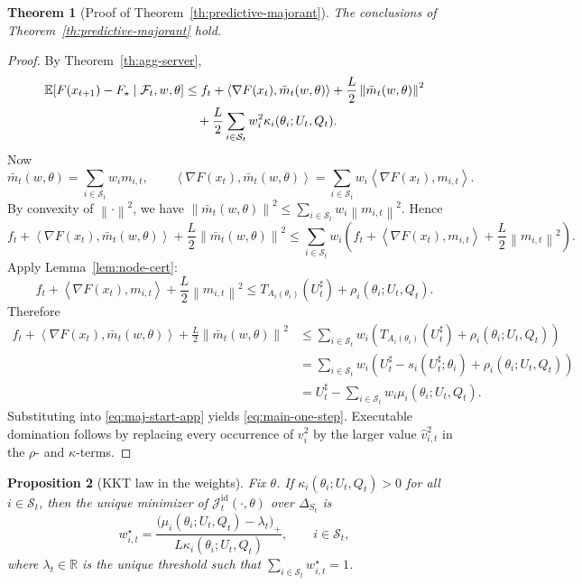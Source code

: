 \documentclass{article}
\newtheorem{theorem}{Theorem}[section]
\newtheorem{proposition}[theorem]{Proposition}
\theoremstyle{definition}
\newcommand{\RR}{\mathbb R}
\newcommand{\EE}{\mathbb E}
\newcommand{\cF}{\mathcal F}
\newcommand{\norm}[1]{\left\lVert #1\right\rVert}
\newcommand{\ip}[2]{\left\langle #1,#2\right\rangle}
\begin{document}
\begin{theorem}[Proof of Theorem~\ref{th:predictive-majorant}]
\label{th:predictive-majorant-proof}
The conclusions of Theorem~\ref{th:predictive-majorant} hold.
\end{theorem}

\begin{proof}
By Theorem~\ref{th:agg-server},
\begin{align}
\EE[F(x_{t+1})-F_\star\mid \cF_t,w,\theta]
&\le
f_t
+
\ip{\nabla F(x_t)}{\bar m_t(w,\theta)}
+
\frac{L}{2}\norm{\bar m_t(w,\theta)}^2
\notag\\
&\quad+
\frac{L}{2}\sum_{i\in\mathcal S_t}w_i^2\kappa_i(\theta_i;U_t,Q_t).
\label{eq:maj-start-app}
\end{align}
Now
\[
\bar m_t(w,\theta)=\sum_{i\in\mathcal S_t} w_i m_{i,t},
\qquad
\ip{\nabla F(x_t)}{\bar m_t(w,\theta)}
=
\sum_{i\in\mathcal S_t} w_i \ip{\nabla F(x_t)}{m_{i,t}}.
\]
By convexity of $\norm{\cdot}^2$, we have $
\norm{\bar m_t(w,\theta)}^2
\le
\sum_{i\in\mathcal S_t}w_i\norm{m_{i,t}}^2$.
Hence
\[
f_t
+
\ip{\nabla F(x_t)}{\bar m_t(w,\theta)}
+
\frac{L}{2}\norm{\bar m_t(w,\theta)}^2
\le
\sum_{i\in\mathcal S_t}w_i
\left(
f_t+\ip{\nabla F(x_t)}{m_{i,t}}+\frac{L}{2}\norm{m_{i,t}}^2
\right).
\]
Apply Lemma~\ref{lem:node-cert}:
\[
f_t+\ip{\nabla F(x_t)}{m_{i,t}}+\frac{L}{2}\norm{m_{i,t}}^2
\le
T_{A_i(\theta_i)}(U_t^\sharp)+\rho_i(\theta_i;U_t,Q_t).
\]
Therefore
\begin{align*}
f_t
+
\ip{\nabla F(x_t)}{\bar m_t(w,\theta)}
+
\frac{L}{2}\norm{\bar m_t(w,\theta)}^2
&\le
\sum_{i\in\mathcal S_t}w_i
\left(
T_{A_i(\theta_i)}(U_t^\sharp)+\rho_i(\theta_i;U_t,Q_t)
\right)
\\
&=
\sum_{i\in\mathcal S_t}w_i
\left(
U_t^\sharp-s_i(U_t^\sharp;\theta_i)+\rho_i(\theta_i;U_t,Q_t)
\right)
\\
&=
U_t^\sharp-\sum_{i\in\mathcal S_t}w_i\mu_i(\theta_i;U_t,Q_t).
\end{align*}
Substituting into \eqref{eq:maj-start-app} yields
\eqref{eq:main-one-step}. Executable domination follows by replacing every
occurrence of $v_i^2$ by the larger value $\widehat v_{i,t}^2$ in the
$\rho$- and $\kappa$-terms.
\end{proof}

\begin{proposition}[KKT law in the weights]
\label{prop:KKT}
Fix $\theta$. If $\kappa_i(\theta_i;U_t,Q_t)>0$ for all $i\in\mathcal S_t$, then
the unique minimizer of $\mathcal J_t^{\mathrm{id}}(\cdot,\theta)$ over
$\Delta_{S_t}$ is
\[
w_{i,t}^\star
=
\frac{\bigl(\mu_i(\theta_i;U_t,Q_t)-\lambda_t\bigr)_+}
{L\kappa_i(\theta_i;U_t,Q_t)},
\qquad
i\in\mathcal S_t,
\]
where $\lambda_t\in\RR$ is the unique threshold such that
$\sum_{i\in\mathcal S_t}w_{i,t}^\star=1$.
\end{proposition}
\end{document}
